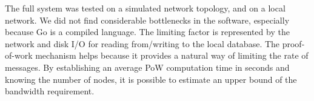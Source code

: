 \documentclass[a4paper,12pt]{article}
\begin{document}
The full system was tested on a simulated network topology, and on a local network. We did not find considerable bottlenecks in the software, especially because Go is a compiled language. The limiting factor is represented by the network and disk I/O for reading from/writing to the local database. The proof-of-work mechanism helps because it provides a natural way of limiting the rate of messages. By establishing an average PoW computation time in seconds and knowing the number of nodes, it is possible to estimate an upper bound of the bandwidth requirement.
\end{document}
